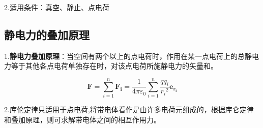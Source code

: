 2.适用条件：真空、静止、点电荷

\subsection{静电力的叠加原理}

1.\textbf{静电力叠加原理}：当空间有两个以上的点电荷时，作用在某一点电荷上的总静电力等于其他各点电荷单独存在时，对该点电荷所施静电力的矢量和。

$$\mathbf{F}=\sum_{i=1}^{n}\mathbf{F_{i}}=\frac{1}{4\pi\varepsilon_{0}}\sum_{i=1}^{n}\frac{qq_{i}}{{r_{i}}^{2}}\mathbf{e_{r_{i}}}$$

2.库伦定律只适用于点电荷,将带电体看作是由许多电荷元组成的，根据库仑定律和叠加原理，则可求解带电体之间的相互作用力。
